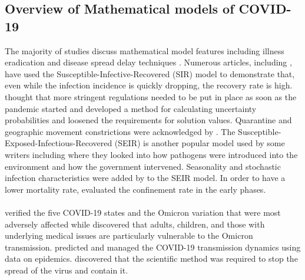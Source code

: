 \documentclass{article}
\begin{document}
\subsection{Overview of Mathematical models of COVID-19}
The majority of studies discuss mathematical model features including illness eradication and disease spread delay techniques \citep{ diekmann2000mathematical, anderson1979population, brauer2012mathematical, hethcote2000mathematics}. Numerous articles, including \citep{adamu2019mathematical}, have used the Susceptible-Infective-Recovered (SIR) model to demonstrate that, even while the infection incidence is quickly dropping, the recovery rate is high. \citep{cooper2020sir} thought that more stringent regulations needed to be put in place as soon as the pandemic started and \citep{chen2021numerical} developed a method for calculating uncertainty probabilities and loosened the requirements for solution values. Quarantine and geographic movement constrictions were acknowledged by \citep{colombo2020age}. The Susceptible-Exposed-Infectious-Recovered (SEIR) is another popular model used by some writers including \citep{he2020seir} where they looked into how pathogens were introduced into the environment and how the government intervened. Seasonality and stochastic infection characteristics were added by \citep{mwalili2020seir} to the SEIR model. In order to have a lower mortality rate, \citep{lopez2021modified} evaluated the confinement rate in the early phases.\\\\
\citep{muniyappan2022stability} verified the five COVID-19 states and the Omicron variation that were most adversely affected while \citep{li2022optimal} discovered that adults, children, and those with underlying medical issues are particularly vulnerable to the Omicron transmission. \citep{samui2020mathematical} predicted and managed the COVID-19 transmission dynamics using data on epidemics. \citep{meehan2020modelling} discovered that the scientific method was required to stop the spread of the virus and contain it.
\end{document}
